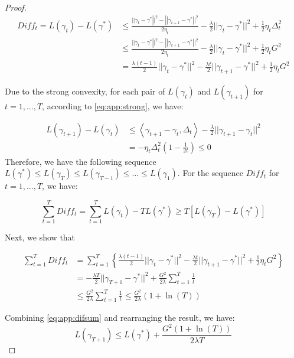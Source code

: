 \begin{proof}
	\begin{equation}\label{eq:app:it_diff}
	\begin{aligned}
	{Diff}_t = L(\gamma_t)-L(\gamma^*) &\leq \frac{{||{\gamma _t} - {\gamma ^*}|{|^2} - ||{\gamma _{t + 1}} - {\gamma ^*}|{|^2}}}{{2{\eta _t}}} - \frac{\lambda }{2}||{\gamma _t} - {\gamma ^*}|{|^2} + \frac{1}{2}{\eta _t}\Delta _t^2 \\
	&\leq \frac{{||{\gamma _t} - {\gamma ^*}|{|^2} - ||{\gamma _{t + 1}} - {\gamma ^*}|{|^2}}}{{2{\eta _t}}} - \frac{\lambda }{2}||{\gamma _t} - {\gamma ^*}|{|^2} + \frac{1}{2}{\eta _t} G^2\\
	&=\frac{\lambda (t-1)}{2}{||{\gamma _t} - {\gamma ^*}||^2}- \frac{\lambda t}{2}{||{\gamma _{t+1}} - {\gamma ^*}||^2}+\frac{1}{2}{\eta _t} G^2
	\end{aligned}
	\end{equation}
	
	Due to the strong convexity, for each pair of $L(\gamma_t)$ and $L(\gamma_{t+1})$ for $t=1,...,T$, according to \eqref{eq:app:strong}, we have:
	
	\begin{equation}
	\begin{aligned}
	L({\gamma _{t + 1}}) - L({\gamma _t}) &\le \left\langle {{\gamma _{t + 1}} - {\gamma _t},{\Delta _t}} \right\rangle  - \frac{\lambda }{2}||{\gamma _{t + 1}} - \gamma_t |{|^2} \\
	&=  - \eta_t\Delta _t^2 (1-\frac{1}{2t}) \leq 0
	\end{aligned}
	\end{equation}
	Therefore, we have the following sequence $L(\gamma^*) \leq L(\gamma_T) \leq L(\gamma_{T-1}) \leq...\leq L(\gamma_1)$. 
	For the sequence $Diff_t$ for $t=1,...,T$, we have:
	
	\begin{equation} \label{eq:app:difsum}
	\sum_{t=1}^{T} Diff_t =  \sum_{t=1}^{T}L(\gamma_t)-TL(\gamma^*) \geq T\left[L(\gamma_T)-L(\gamma^*)\right]
	\end{equation}
	
	Next, we show that 
	
	\begin{equation}
	\begin{aligned}
	\sum_{t=1}^{T} Diff_t &=\sum_{t=1}^{T}\left\{\frac{\lambda (t-1)}{2}{||{\gamma _t} - {\gamma ^*}||^2}- \frac{\lambda t}{2}{||{\gamma _{t+1}} - {\gamma ^*}||^2}+\frac{1}{2}{\eta _t} G^2\right\} \\
	&=-\frac{\lambda T}{2}{||{\gamma _{T+1}-\gamma^*}||^2} + \frac{G^2}{2 \lambda}\sum_{t=1}^{T} \frac{1}{t}\\
	&\leq \frac{G^2}{2 \lambda}\sum_{t=1}^{T} \frac{1}{t} \leq \frac{G^2}{2 \lambda}(1+\ln(T))
	\end{aligned}
	\end{equation}
	
	Combining \eqref{eq:app:difsum} and rearranging the result, we have:
	\begin{equation*}
	L(\gamma_{T+1}) \leq L(\gamma^*)+\frac{G^2(1+\ln (T))}{2\lambda T}
	\end{equation*}
\end{proof}